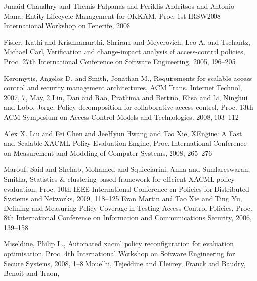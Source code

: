 \documentclass{acm_proc_article-sp}
\begin{document}
%


%
%







 



\begin{thebibliography}{1}
Junaid Chaudhry and Themis Palpanas and Periklis Andritsos and Antonio
	Mana,
Entity Lifecycle Management for OKKAM,
Proc. 1st IRSW2008 International Workshop on Tenerife,
2008

Fisler, Kathi and Krishnamurthi, Shriram and Meyerovich, Leo A. and
	Tschantz, Michael Carl,
Verification and change-impact analysis of access-control policies,
Proc. 27th International Conference on Software Engineering,
2005, 196--205

Keromytis, Angelos D. and Smith, Jonathan M.,
Requirements for scalable access control and security management
	architectures, ACM Trans. Internet Technol,
2007,
7,
May,
2
Lin, Dan and Rao, Prathima and Bertino, Elisa and Li, Ninghui and
	Lobo, Jorge,
Policy decomposition for collaborative access control,
Proc. 13th ACM Symposium on Access Control Models and Technologies,
2008,
103--112

Alex X. Liu and Fei Chen and JeeHyun Hwang and Tao Xie,
XEngine: A Fast and Scalable {XACML} Policy Evaluation Engine,
Proc. International Conference on Measurement and Modeling of Computer
	Systems,
2008,
265--276

Marouf, Said and Shehab, Mohamed and Squicciarini, Anna and Sundareswaran,
	Smitha,
Statistics \& clustering based framework for efficient XACML policy
	evaluation,
Proc. 10th IEEE International Conference on Policies for Distributed
	Systems and Networks,
2009,
118--125
Evan Martin and Tao Xie and Ting Yu,
Defining and Measuring Policy Coverage in Testing Access Control
	Policies,
Proc. 8th International Conference on Information and Communications
	Security,
2006,
139--158

Miseldine, Philip L.,
Automated xacml policy reconfiguration for evaluation optimisation,
Proc. 4th International Workshop on Software Engineering for Secure
	Systems,
2008,
1--8
Mouelhi, Tejeddine and Fleurey, Franck and Baudry, Benoit and Traon,


\end{thebibliography}
\end{document}
